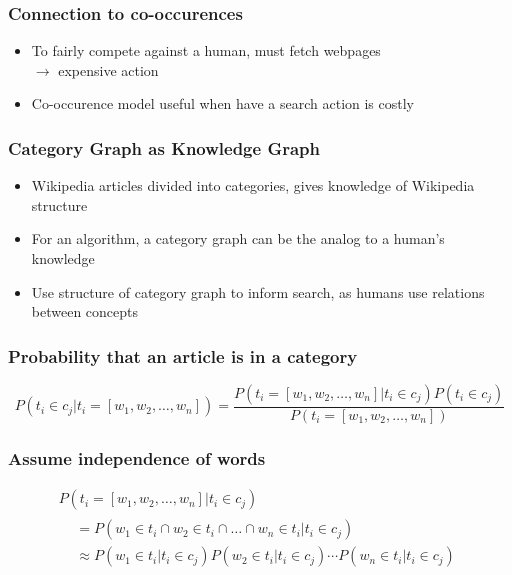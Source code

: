 \documentclass{beamer}
\begin{document}
\begin{frame}
  \frametitle{Connection to co-occurences}

\begin{itemize}
  \item To fairly compete against a human, must fetch webpages \\
    \hspace{0.3in}$\longrightarrow$ expensive action

  \item Co-occurence model useful when have a search action is costly
\end{itemize}

\end{frame}

\begin{frame}
  \frametitle{Category Graph as Knowledge Graph}
\begin{itemize}
  \item Wikipedia articles divided into categories, gives knowledge of Wikipedia
    structure
  \item For an algorithm, a category graph can be the analog to a human's
    knowledge
    
  \item Use structure of category graph to inform search, as humans use
    relations between concepts

\end{itemize}
\end{frame}

\begin{frame}
  \frametitle{Probability that an article is in a category}

\[P(t_i \in c_j | t_i = [w_1, w_2, \dots, w_n]) = \frac{P(t_i = [w_1, w_2,
  \dots, w_n] | t_i \in c_j) P(t_i \in c_j)}{P(t_i = [w_1, w_2, \dots, w_n])}\]

\end{frame}

\begin{frame}
\frametitle{Assume independence of words}

\begin{multline*}
P(t_i = [w_1, w_2, \dots, w_n] | t_i \in c_j) \\
\begin{aligned}
& = P(w_1 \in t_i \cap w_2 \in t_i \cap \dots \cap w_n \in t_i | t_i \in c_j) \\
& \approx P(w_1 \in t_i | t_i \in c_j) P(w_2 \in t_i | t_i \in c_j) \cdots P(w_n
\in t_i | t_i \in c_j) \\
\end{aligned}
\end{multline*}

\end{frame}
\end{document}
